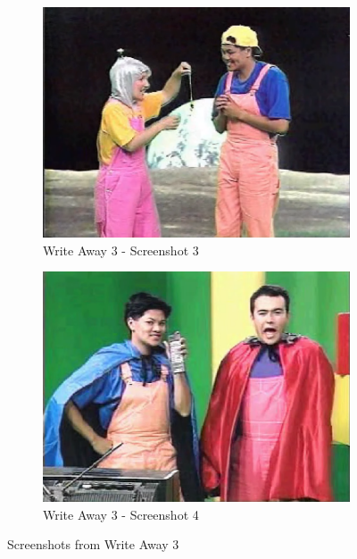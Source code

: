 \begin{figure}[H]
    \begin{subfigure}{0.45\textwidth}
        \centering
        \includegraphics[width=\linewidth]{Games/WriteAway/Images/WriteAway3Screenshot3.png}
        \caption{Write Away 3 - Screenshot 3}
    \end{subfigure}
    \begin{subfigure}{0.45\textwidth}
        \centering
        \includegraphics[width=\linewidth]{Games/WriteAway/Images/WriteAway3Screenshot4.png}
        \caption{Write Away 3 - Screenshot 4}
    \end{subfigure}
    \caption{Screenshots from Write Away 3}
\end{figure}
